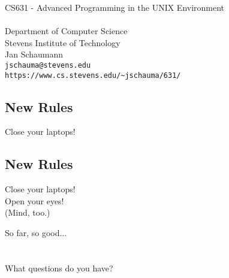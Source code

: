\documentclass[sxga]{xdvislides}
\begin{document}
\setfontphv

\lhead{\slidetitle}
\cfoot{\relax}
\rfoot{\Gray{\today}}

\vspace*{\fill}
\begin{center}
	\Hugesize
		CS631 - Advanced Programming in the UNIX Environment\\ [1em]
	\hspace*{5mm}\blueline\\ [1em]
	\Normalsize
		Department of Computer Science\\
		Stevens Institute of Technology\\
		Jan Schaumann\\
		\verb+jschauma@stevens.edu+\\
		\verb+https://www.cs.stevens.edu/~jschauma/631/+
\end{center}
\vspace*{\fill}

\subsection{New Rules}
\Hugesize
\vspace*{\fill}
\begin{center}
Close your laptops!
\end{center}
\vspace*{\fill}
\Normalsize

\subsection{New Rules}
\Hugesize
\vspace*{\fill}
\begin{center}
Close your laptops! \\
\vspace{.5in}
Open your eyes! \\
\small
(Mind, too.)
\end{center}
\vspace*{\fill}
\Normalsize

\newpage
\vspace*{\fill}
\begin{center}
    \Hugesize
        So far, so good...\\ [1em]
    \hspace*{5mm}
    \blueline\\
    \hspace*{5mm}\\
	What questions do you have?
\end{center}
\vspace*{\fill}
\end{document}
